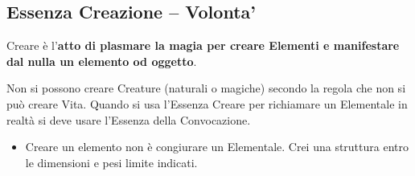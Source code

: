 \documentclass[a4paper,11pt,twoside,openany]{book}
\begin{document}
\pagebreak

\subsection{Essenza Creazione -- Volonta'}

\label{essenza-creazione---volonta}

Creare è l'\textbf{atto di plasmare la magia per creare Elementi e manifestare dal nulla un elemento od oggetto}.

Non si possono creare Creature (naturali o magiche) secondo la regola che non si può creare Vita. Quando si usa l'Essenza Creare per richiamare un Elementale in realtà si deve usare l'Essenza della Convocazione.

\begin{itemize}
\item Creare un elemento non è congiurare un Elementale. Crei una struttura entro le dimensioni e pesi limite indicati. 
\end{itemize}
\end{document}
